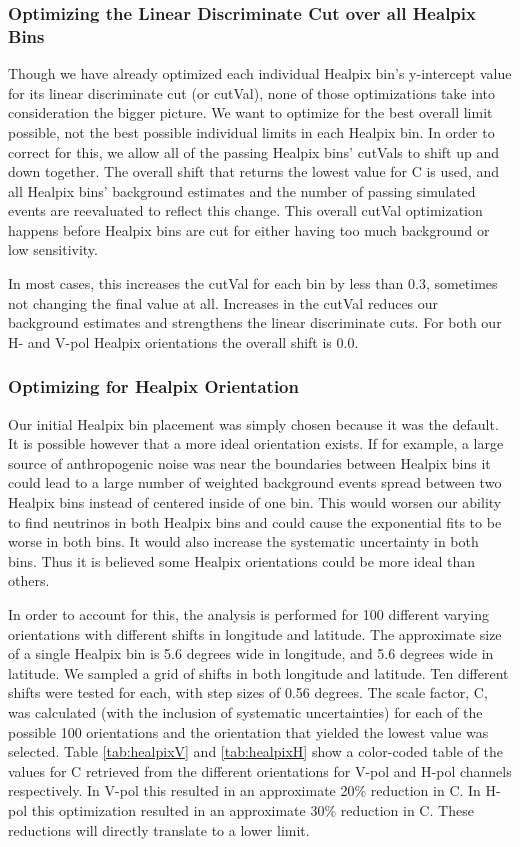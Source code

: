 \subsubsection{Optimizing the Linear Discriminate Cut over all Healpix Bins} \label{subsubsec:optLDCutOverall}

Though we have already optimized each individual Healpix bin's y-intercept value for its linear discriminate cut (or cutVal), none of those optimizations take into consideration the bigger picture.  We want to optimize for the best overall limit possible, not the best possible individual limits in each Healpix bin.  In order to correct for this, we allow all of the passing Healpix bins' cutVals to shift up and down together.   The overall shift that returns the lowest value for C is used, and all Healpix bins' background estimates and the number of passing simulated events are reevaluated to reflect this change.  This overall cutVal optimization happens before Healpix bins are cut for either having too much background or low sensitivity.  

In most cases, this increases the cutVal for each bin by less than 0.3, sometimes not changing the final value at all.  Increases in the cutVal reduces our background estimates and strengthens the linear discriminate cuts.  For both our H- and V-pol Healpix orientations the overall shift is 0.0.

\subsubsection{Optimizing for Healpix Orientation}

Our initial Healpix bin placement was simply chosen because it was the default.  It is possible however that a more ideal orientation exists.  If for example, a large source of anthropogenic noise was near the boundaries between Healpix bins it could lead to a large number of weighted background events spread between two Healpix bins instead of centered inside of one bin.  This would worsen our ability to find neutrinos in both Healpix bins and could cause the exponential fits to be worse in both bins.  It would also increase the systematic uncertainty in both bins.  Thus it is believed some Healpix orientations could be more ideal than others. 

In order to account for this, the analysis is performed for 100 different varying orientations with different shifts in longitude and latitude.  The approximate size of a single Healpix bin is 5.6 degrees wide in longitude, and 5.6 degrees wide in latitude.  We sampled a grid of shifts in both longitude and latitude.  Ten different shifts were tested for each, with step sizes of 0.56 degrees.  The scale factor, C, was calculated (with the inclusion of systematic uncertainties) for each of the possible 100 orientations and the orientation that yielded the lowest value was selected.  Table \ref{tab:healpixV} and \ref{tab:healpixH} show a color-coded table of the values for C retrieved from the different orientations for V-pol and H-pol channels respectively.  In V-pol this resulted in an approximate 20\% reduction in C.  In H-pol this optimization resulted in an approximate 30\% reduction in C.  These reductions will directly translate to a lower limit.

